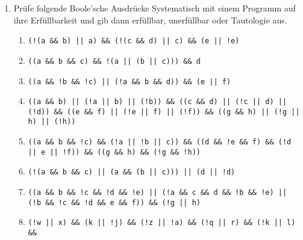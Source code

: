 \documentclass{../../sheet}
\begin{document}
\begin{enumerate}
    \item Prüfe folgende Boole'sche Ausdrücke Systematisch mit einem Programm auf ihre Erfüllbarkeit und gib dann erfüllbar, unerfüllbar oder Tautologie aus. 
    \begin{enumerate}
        \item \begin{ausgabe} \texttt{(!(a \&\& b) || a) \&\& (!(c \&\& d) || c) \&\& (e || !e)} \end{ausgabe} %
        \item \begin{ausgabe} \texttt{((a \&\& b \&\& c) \&\& !(a || (b || c))) \&\& d} \end{ausgabe} %
        \item \begin{ausgabe} \texttt{((a \&\& !b \&\& !c) || (!a \&\& b \&\& d)) \&\& (e || f)} \end{ausgabe} %
        \item \begin{ausgabe} \texttt{((a \&\& b) || (!a || b) || (!b)) \&\&
            ((c \&\& d) || (!c || d) || (!d)) \&\&
            ((e \&\& f) || (!e || f) || (!f)) \&\&
            ((g \&\& h) || (!g || h) || (!h))} 
        \end{ausgabe} %
        \item \begin{ausgabe} \texttt{((a \&\& b \&\& !c) \&\& (!a || !b || c)) \&\&
            ((d \&\& !e \&\& f) \&\& (!d || e || !f)) \&\&
            ((g \&\& h) \&\& (!g \&\& !h))} 
        \end{ausgabe} %
        \item \begin{ausgabe} \texttt{(!(a \&\& b \&\& c) || (a \&\& (b || c))) || (d || !d)} \end{ausgabe} %
        \item \begin{ausgabe} \texttt{((a \&\& b \&\& !c \&\& !d \&\& !e) ||
            (!a \&\& c \&\& d \&\& !b \&\& !e) ||
            (!b \&\& !c \&\& !d \&\& e \&\& f)) \&\& (!g || h)} 
        \end{ausgabe} %
        \item \begin{ausgabe} \texttt{(!w || x) \&\&
            (k || !j) \&\&
            (!z || !a) \&\&
            (!q || r) \&\&
            (!k || l) \&\&\\
}
\end{ausgabe}
\end{enumerate}
\end{enumerate}
\end{document}
